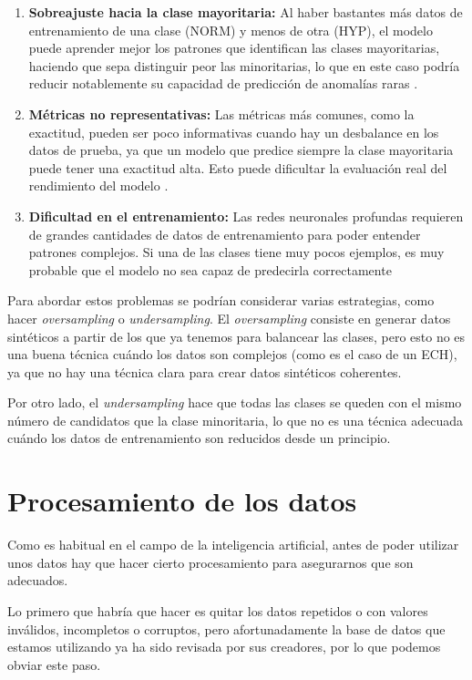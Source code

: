 \begin{enumerate}
	\item \textbf{Sobreajuste hacia la clase mayoritaria:} Al haber bastantes más datos de entrenamiento de una clase (NORM) y menos de otra (HYP), el modelo puede aprender mejor los patrones que identifican las clases mayoritarias, haciendo que sepa distinguir peor las minoritarias, lo que en este caso podría reducir notablemente su capacidad de predicción de anomalías raras \citep{IData}.
	
	\item \textbf{Métricas no representativas:} Las métricas más comunes, como la exactitud, pueden ser poco informativas cuando hay un desbalance en los datos de prueba, ya que un modelo que predice siempre la clase mayoritaria puede tener una exactitud alta. Esto puede dificultar la evaluación real del rendimiento del modelo \citep{ClassOfIData}.
	
	\item \textbf{Dificultad en el entrenamiento:} Las redes neuronales profundas requieren de grandes cantidades de datos de entrenamiento para poder entender patrones complejos. Si una de las clases tiene muy pocos ejemplos, es muy probable que el modelo no sea capaz de predecirla correctamente \citep{Leevy}
\end{enumerate}

Para abordar estos problemas se podrían considerar varias estrategias, como hacer \emph{oversampling} o \emph{undersampling}. El \emph{oversampling} consiste en generar datos sintéticos a partir de los que ya tenemos para balancear las clases, pero esto no es una buena técnica cuándo los datos son complejos (como es el caso de un ECH), ya que no hay una técnica clara para crear datos sintéticos coherentes.

Por otro lado, el \emph{undersampling} hace que todas las clases se queden con el mismo número de candidatos que la clase minoritaria, lo que no es una técnica adecuada cuándo los datos de entrenamiento son reducidos desde un principio.

\section{Procesamiento de los datos}

Como es habitual en el campo de la inteligencia artificial, antes de poder utilizar unos datos hay que hacer cierto procesamiento para asegurarnos que son adecuados.

Lo primero que habría que hacer es quitar los datos repetidos o con valores inválidos, incompletos o corruptos, pero afortunadamente la base de datos que estamos utilizando ya ha sido revisada por sus creadores, por lo que podemos obviar este paso.

